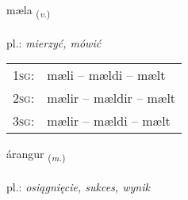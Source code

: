 \documentclass[frontgrid, backgrid]{flacards}\usepackage[]{graphicx}\usepackage[]{xcolor}
\begin{document}
\renewcommand{\flhead}{\vskip5pt \fboxsep=0pt {\small\bfseries\footnotesize Sagnorð | czasownik}}
\renewcommand{\fcfoot}{\vskip5pt \fboxsep=0pt \hspace{2pt}{\small\bfseries\footnotesize 1K}}

\renewcommand{\blhead}{\vskip5pt {\small\bfseries\footnotesize Sagnorð | czasownik }}
\renewcommand{\bcfoot}{\vskip5pt \hspace{2pt}{\small\bfseries\footnotesize 1K}}


{mæla \small{\textsubscript{(\textit{v.})}} \\[1ex] %
\textphonetic{[maiːla]} \\
pl.: \emph{mierzyć, mówić} \\  [2ex]
\renewcommand*{\arraystretch}{0.8}
\begin{tabular}{p{1cm}l}
\textsc{1sg}: & mæli -- mældi -- mælt \\ 
\textsc{2sg}: & mælir -- mældir -- mælt \\ 
\textsc{3sg}: & mælir -- mældi -- mælt \\ 
\end{tabular}
}

\renewcommand{\flhead}{\vskip5pt \fboxsep=0pt {\small\bfseries\footnotesize Nafnorð | rzeczownik}}
\renewcommand{\fcfoot}{\vskip5pt \fboxsep=0pt \hspace{2pt}{\small\bfseries\footnotesize 1K}}

\renewcommand{\blhead}{\vskip5pt {\small\bfseries\footnotesize Nafnorð | rzeczownik }}
\renewcommand{\bcfoot}{\vskip5pt \hspace{2pt}{\small\bfseries\footnotesize 1K}}


{árangur \small{\textsubscript{(\textit{m.})}} \\[1ex] %
\textphonetic{[auːrauŋkʏr]} \\
pl.: \emph{osiągnięcie, sukces, wynik} \\  [2ex]
\renewcommand*{\arraystretch}{0.8}
}
\end{document}
